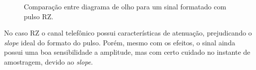 \begin{figure}[H]
\begin{center}
\end{center}
\caption{Comparação entre diagrama de olho para um sinal formatado com pulso RZ.}
\label{fig:3} 
\end{figure}

No caso RZ o canal telefônico possui características de atenuação, prejudicando o \textit{slope} ideal do formato do pulso. Porém, mesmo com os efeitos, o sinal ainda possui uma boa sensibilidade a amplitude, mas com certo cuidado no instante de amostragem, devido ao \textit{slope}.

